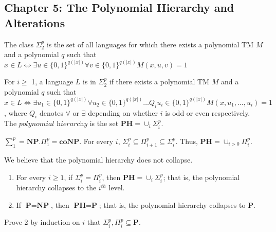\subsection*{Chapter 5: The Polynomial Hierarchy and Alterations}
\begin{note}
The class $\Sigma_{2}^{p}$ is the set of all languages for which there exists a polynomial TM $M$
and a polynomial $q$ such that
$x \in L \iff \exists u \in \{0,1\}^{q(|x|)} \forall v \in \{0,1\}^{q(|x|)} M(x, u, v) = 1 $
\end{note}

\begin{note}
For $ i \geq$ 1, a language $L$ is in $\Sigma_{2}^{p}$ if there exists a polynomial TM $M$
and a polynomial $q$ such that
$x \in L \iff \exists u_{1} \in \{0,1\}^{q(|x|)} \forall u_{2} \in \{0,1\}^{q(|x|)} \ldots
Q_{i}u_{i} \in \{0,1\}^{q(|x|)} M(x, u_{1}, \ldots, u_{i}) = 1 $,
where $Q_i$ denotes $\forall$ or $\exists$ depending on whether $i$ is odd or even respectively.
The $\textit{polynomial hierarchy}$ is the set $\textbf{PH} = \cup_{i} \Sigma_{i}^{p}$.
\end{note}

\begin{note}
$\sum_{1}^{p} = \textbf{NP}. 
\Pi_{1}^{p} = \textbf{coNP}$. 
For every $i$, $\Sigma_{i}^{p} \subseteq \Pi_{i+1}^{p} \subseteq \Sigma_{i}^{p}.$ 
Thus, $\textbf{PH} = \cup_{i > 0} \Pi_{i}^{p}$.
\end{note}

\begin{note}[Collapse]
We believe that the polynomial hierarchy does not collapse.

\begin{enumerate}
	\item
		For every $i \geq 1$, if $\Sigma_{i}^{p} = \Pi_{i}^{p}$, then 
		$\textbf{PH} = \cup_{i} \Sigma_{i}^{p}$; that is, the polynomial hierarchy collapses
		to the $i^{th}$ level.
	\item
		If $\textbf{P} = \textbf{NP}$, then $\textbf{PH} = \textbf{P}$; that is, the polynomial
		hierarchy collapses to $\textbf{P}$.
\end{enumerate}
Prove 2 by induction on $i$ that $\Sigma_{i}^{p}, \Pi_{i}^{p} \subseteq \textbf{P}$.
\end{note}

